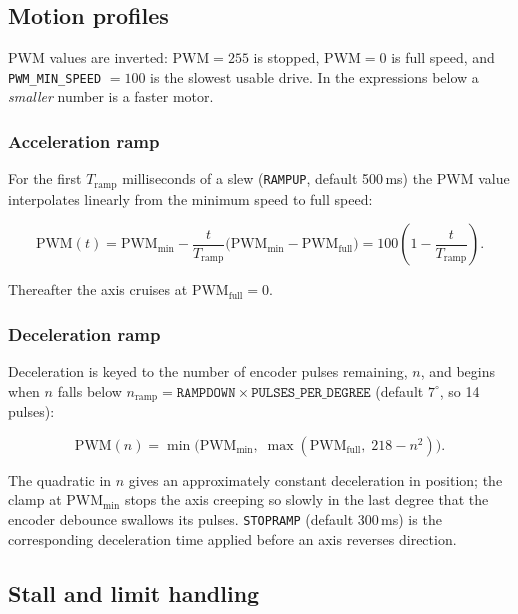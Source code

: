 \documentclass[11pt,a4paper]{article}
\begin{document}
\subsection{Motion profiles}

PWM values are inverted: $\text{PWM}=255$ is stopped, $\text{PWM}=0$ is full speed, and \texttt{PWM\_MIN\_SPEED} $=100$ is the slowest usable drive. In the expressions below a \emph{smaller} number is a faster motor.

\subsubsection{Acceleration ramp}

For the first $T_\text{ramp}$ milliseconds of a slew (\texttt{RAMPUP}, default 500\,ms) the PWM value interpolates linearly from the minimum speed to full speed:

\begin{equation}
\text{PWM}(t) = \text{PWM}_\text{min} - \frac{t}{T_\text{ramp}}\bigl(\text{PWM}_\text{min} - \text{PWM}_\text{full}\bigr)
             = 100\left(1 - \frac{t}{T_\text{ramp}}\right).
\end{equation}

Thereafter the axis cruises at $\text{PWM}_\text{full}=0$.

\subsubsection{Deceleration ramp}

Deceleration is keyed to the number of encoder pulses remaining, $n$, and begins when $n$ falls below $n_\text{ramp} = \texttt{RAMPDOWN} \times \texttt{PULSES\_PER\_DEGREE}$ (default $7^\circ$, so 14 pulses):

\begin{equation}
\text{PWM}(n) = \min\bigl(\text{PWM}_\text{min},\; \max(\text{PWM}_\text{full},\; 218 - n^2)\bigr).
\end{equation}

The quadratic in $n$ gives an approximately constant deceleration in position; the clamp at $\text{PWM}_\text{min}$ stops the axis creeping so slowly in the last degree that the encoder debounce swallows its pulses. \texttt{STOPRAMP} (default 300\,ms) is the corresponding deceleration time applied before an axis reverses direction.

\subsection{Stall and limit handling}
\end{document}
